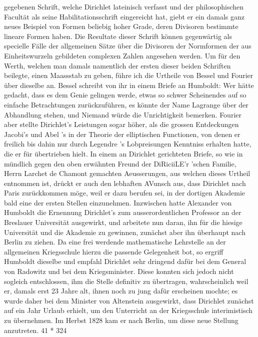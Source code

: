 \documentclass[11pt]{article}
\begin{document}
\noindent gegebenen Schrift, welche Dirichlet lateinisch verfasst und der philosophischen Facultät als seine Habilitationsschrift eingereicht hat, giebt er ein damals ganz neues Beispiel von Formen beliebig hoher Grade, deren Divisoren bestimmte lineare Formen haben. Die Resultate dieser Schrift können gegenwärtig als specielle Fälle der allgemeinen Sätze über die Divisoren der Normformen der aus Einheitswurzeln gebildeten complexen Zahlen angesehen werden. Um für den Werth, welchen man damals namentlich der ersten dieser beiden Schriften beilegte, einen Maassstab zu geben, führe ich die Urtheile von Bessel und Fourier über dieselbe an. Bessel schreibt von ihr in einem Briefe an Humboldt: Wer hätte gedacht, dass es dem Genie gelingen werde, etwas so schwer Scheinendes auf so einfache Betrachtungen zurückzuführen, es könnte der Name Lagrange über der Abhandlung stehen, und Niemand würde die Unrichtigkeit bemerken. Fourier aber stellte Dirichlet’s Leistungen sogar höher, als die grossen Entdeckungen Jacobi’s und Abel ’s in der Theorie der elliptischen Functionen, von denen er freilich bis dahin nur durch Legendre ’s Lobpreisungen Kenntniss erhalten hatte, die er für übertrieben hielt. In einem an Dirichlet gerichteten Briefe, so wie in mündlich gegen den oben erwähnten Freund der DiRiciiLE'r ’schen Familie, Herrn Larchet de Chamont gemachten Aeusserungen, aus welchen dieses Urtheil entnommen ist, drückt er auch den lebhaften AVunsch aus, dass Dirichlet nach Paris zurückkommen möge, weil er dazu berufen sei, in der dortigen Akademie bald eine der ersten Stellen einzunehmen. Inzwischen hatte Alexander von Humboldt die Ernennung Dirichlet’s zum ausserordentlichen Professor an der Breslauer Universität ausgewirkt, und arbeitete nun daran, ihn für die hiesige Universität und die Akademie zu gewinnen, zunächst aber ihn überhaupt nach Berlin zu ziehen. Da eine frei werdende mathematische Lehrstelle an der allgemeinen Kriegsschule hierzu die passende Gelegenheit bot, so ergriff Humboldt dieselbe und empfahl Dirichlet sehr dringend dafür bei dem General von Radowitz und bei dem Kriegsminister. Diese konnten sich jedoch nicht sogleich entschlossen, ihm die Stelle definitiv zu übertragen, wahrscheinlich weil er, damals erst 23 Jahre alt, ihnen noch zu jung dafür erscheinen mochte; es wurde daher bei dem Minister von Altenstein ausgewirkt, dass Dirichlet zunächst auf ein Jahr Urlaub erhielt, um den Unterricht an der Kriegsschule interimistisch zu übernehmen. Im Herbst 1828 kam er nach Berlin, um diese neue Stellung anzutreten. 41 * 324 
\par
\end{document}
